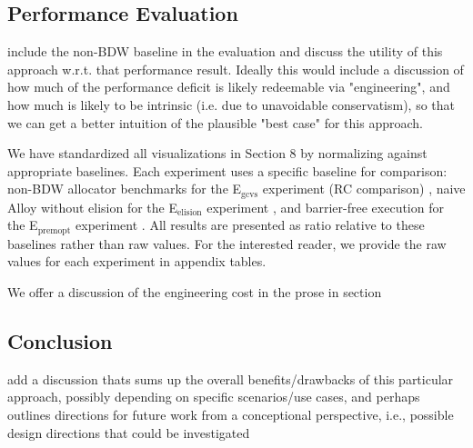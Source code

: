 \documentclass[12pt,a4paper,preprint]{article}
\newcommand\Egcrc{E$_\textrm{gcvs}$\xspace}
\newcommand\Eelision{E$_\textrm{elision}$\xspace}
\newcommand\Epremopt{E$_\textrm{premopt}$\xspace}
\begin{document}
\subsection*{Performance Evaluation}

\begin{blockquote}
include the non-BDW baseline in the evaluation and discuss the utility of this approach w.r.t. that performance result. Ideally this would include a discussion of how much of the performance deficit is likely redeemable via "engineering", and how much is likely to be intrinsic (i.e. due to unavoidable conservatism), so that we can get a better intuition of the plausible "best case" for this approach.
\end{blockquote}

We have standardized all visualizations in Section 8 by normalizing against
appropriate baselines. Each experiment uses a specific baseline for comparison:
non-BDW allocator benchmarks for the \Egcrc experiment (RC comparison)
, naive Alloy without elision for the \Eelision
experiment , and barrier-free execution for the
\Epremopt experiment . All results are presented as
ratio relative to these baselines rather than raw values. For the interested
reader, we provide the raw values for each experiment in appendix tables.

We offer a discussion of the engineering cost in the prose in section 

\subsection*{Conclusion}

\begin{blockquote}
add a discussion thats sums up the overall benefits/drawbacks of this particular approach, possibly depending on specific scenarios/use cases, and perhaps outlines directions for future work from a conceptional perspective, i.e., possible design directions that could be investigated
\end{blockquote}
\end{document}
